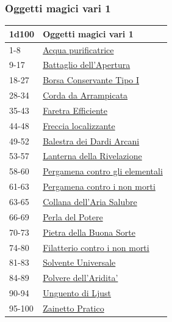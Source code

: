 \begin{multicols}{2}
{\subsubsection{Oggetti magici vari 1}\hypertarget{Oggetti Magici Vari 1}{}

{\small\begin{tabularx}{\linewidth}{ll}
		\toprule
\rowcolor{gray!20}\textbf{1d100} & \textbf{Oggetti magici vari 1}\\
\toprule
1-8 & \hyperlink{Acqua purificatrice}{Acqua purificatrice}\\
\rowcolor{gray!20}9-17 & \hyperlink{Battaglio dell'Apertura}{Battaglio dell'Apertura}\\
18-27 & \hyperlink{Borsa Conservante TipoI}{Borsa Conservante Tipo I}\\
\rowcolor{gray!20}28-34 & \hyperlink{Corda da Arrampicata}{Corda da Arrampicata}\\
35-43 & \hyperlink{Faretra Efficiente}{Faretra Efficiente}\\
\rowcolor{gray!20}44-48 & \hyperlink{Freccia localizzante}{Freccia localizzante}\\
49-52 & \hyperlink{Balestra dei Dardi Arcani}{Balestra dei Dardi Arcani}\\
\rowcolor{gray!20}53-57 & \hyperlink{Lanterna della Rivelazione}{Lanterna della Rivelazione}\\
58-60 & \hyperlink{Pergamena contro gli elementali}{Pergamena contro gli elementali}\\
\rowcolor{gray!20}61-63 & \hyperlink{Pergamena contro i nonmorti}{Pergamena contro i non morti}\\
63-65 & \hyperlink{Collana dell'Aria Salubre}{Collana dell'Aria Salubre}\\
\rowcolor{gray!20}66-69 & \hyperlink{Perla del Potere}{Perla del Potere}\\
70-73 & \hyperlink{Pietra della Buona Sorte}{Pietra della Buona Sorte}\\
\rowcolor{gray!20}74-80 & \hyperlink{Filatterio contro i nonmorti}{Filatterio contro i non morti}\\
81-83 & \hyperlink{Solvente Universale}{Solvente Universale}\\
\rowcolor{gray!20}84-89 & \hyperlink{Polvere dell'Aridita'}{Polvere dell'Aridita'}\\
90-94 & \hyperlink{Unguento di Ljust}{Unguento di Ljust}\\
\rowcolor{gray!20}95-100 & \hyperlink{Zainetto Pratico}{Zainetto Pratico}
\end{tabularx}}

}
\end{multicols}
